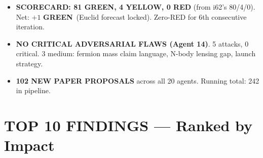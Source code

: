 \documentclass[11pt,a4paper]{article}
\newcommand{\GREEN}{\textcolor{dfdgreen}{\textbf{GREEN}}}
\newcommand{\YELLOW}{\textcolor{dfdyellow}{\textbf{YELLOW}}}
\newcommand{\RED}{\textcolor{dfdred}{\textbf{RED}}}
\begin{document}
\begin{itemize}
\item \textbf{SCORECARD: 81 \GREEN, 4 \YELLOW, 0 \RED} (from i62's 80/4/0). Net: $+1$ \GREEN\ (Euclid forecast locked). Zero-RED for 6th consecutive iteration.

\item \textbf{NO CRITICAL ADVERSARIAL FLAWS (Agent 14)}. 5 attacks, 0 critical. 3 medium: fermion mass claim language, N-body lensing gap, launch strategy.

\item \textbf{102 NEW PAPER PROPOSALS} across all 20 agents. Running total: 242 in pipeline.
\end{itemize}


\section{TOP 10 FINDINGS --- Ranked by Impact}
\label{sec:top10}
\end{document}
